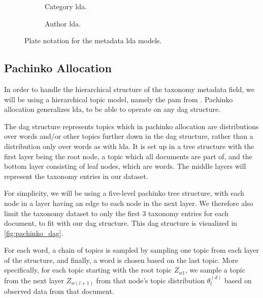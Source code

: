 \begin{figure*}[ht]
	\centering
	\begin{subfigure}{0.3\textwidth}
		\centering
		
		\caption{Category \gls{lda}.}
		\label{fig:category_lda}
	\end{subfigure}
	\hspace{5em}
	\begin{subfigure}{0.3\textwidth}
		\centering
		
		\caption{Author \gls{lda}.}
		\label{fig:author_lda}
	\end{subfigure}
	\caption{Plate notation for the metadata \gls{lda} models.}
	\label{fig:metadata_lda}
\end{figure*}

\subsection{Pachinko Allocation}
In order to handle the hierarchical structure of the taxonomy metadata field, we will be using a hierarchical topic model, namely the \acrlong{pam} from \citet{li2006pachinko}.
Pachinko allocation generalizes \gls{lda}, to be able to operate on any \gls{dag} structure.

The \gls{dag} structure represents topics which in pachinko allocation are distributions over words and/or other topics further down in the \gls{dag} structure, rather than a distribution only over words as with \gls{lda}.
It is set up in a tree structure with the first layer being the root node, a topic which all documents are part of, and the bottom layer consisting of leaf nodes, which are words.
The middle layers will represent the taxonomy entries in our dataset.

For simplicity, we will be using a five-level pachinko tree structure, with each node in a layer having an edge to each node in the next layer.
We therefore also limit the taxonomy dataset to only the first $3$ taxonomy entries for each document, to fit with our \gls{dag} structure.
This \gls{dag} structure is visualized in \autoref{fig:pachinko_dag}.

For each word, a chain of topics is sampled by sampling one topic from each layer of the structure, and finally, a word is chosen based on the last topic.
More specifically, for each topic starting with the root topic $Z_{w1}$, we sample a topic from the next layer $Z_{w(l+1)}$ from that node's topic distribution $\theta_l^{(d)}$ based on observed data from that document.

